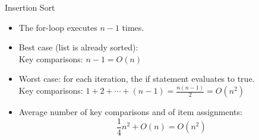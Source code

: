 \documentclass[14pt,aspectratio=1610]{beamer}
\begin{document}
\begin{frame}{Insertion Sort}
  \begin{itemize}
    \item
      The for-loop executes \(n - 1\) times.
    \item
      Best case (list is already sorted):\\
      Key comparisons: \(n - 1 = O(n)\)
    \item 
      Worst case: for each iteration, the if statement evaluates to true.\\
      Key comparisons: \(1 + 2 + \cdots + (n - 1) = \frac{n(n - 1)}{2} = O(n^2)\)
    \item 
      Average number of key comparisons and of item assignments:
      \begin{equation*}
        \frac{1}{4} n^2 + O(n) = O(n^2)
      \end{equation*}
    \end{itemize}
\end{frame}


\end{document}
